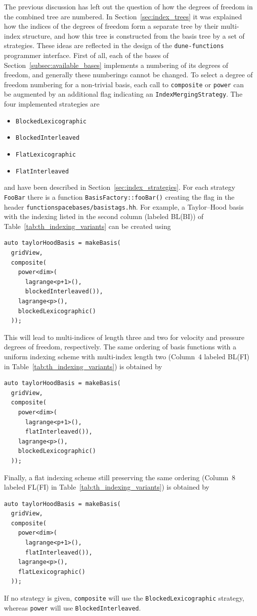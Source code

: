 \documentclass[a4paper,10pt,headings=normal,bibliography=totoc]{scrartcl}
\newcommand{\cpp}[1]{\lstinline[basicstyle=\ttfamily]!#1!}
\newcommand{\dunemodule}[1]{\texttt{#1}}
\newcommand{\file}[1]{\texttt{#1}}
\begin{document}
The previous discussion has left out the question of how the degrees of freedom in the combined tree
are numbered.  In Section~\ref{sec:index_trees} it was explained how the indices
of the degrees of freedom form a separate tree by their multi-index structure, and how this tree
is constructed from the basis tree by a set of strategies.
These ideas are reflected in the design of the \dunemodule{dune-functions} programmer interface.
First of all, each of the bases of
Section~\ref{subsec:available_bases} implements a numbering of its degrees of freedom,
and generally these numberings cannot be changed.
To select a degree of freedom numbering for a non-trivial basis,
each call to \cpp{composite} or \cpp{power} can be augmented by an additional
flag indicating an \cpp{IndexMergingStrategy}. The four implemented strategies are
\begin{itemize}
  \item
    \cpp{BlockedLexicographic}
  \item
    \cpp{BlockedInterleaved}
  \item
    \cpp{FlatLexicographic}
  \item
    \cpp{FlatInterleaved}
\end{itemize}
and have been described in Section~\ref{sec:index_strategies}.
For each strategy \cpp{FooBar} there is a function \cpp{BasisFactory::fooBar()} creating
the flag in the header \file{functionspacebases/\allowbreak basistags.hh}.
For example, a Taylor--Hood basis with the indexing listed in the
second column (labeled BL(BI)) of Table~\ref{tab:th_indexing_variants} can be created using
\begin{lstlisting}[style=Example]
auto taylorHoodBasis = makeBasis(
  gridView,
  composite(
    power<dim>(
      lagrange<p+1>(),
      blockedInterleaved()),
    lagrange<p>(),
    blockedLexicographic()
  ));
\end{lstlisting}
This will lead to multi-indices of length three and two
for velocity and pressure degrees of freedom, respectively.
The same ordering of basis functions with a uniform indexing scheme
with multi-index length two (Column~4 labeled BL(FI) in Table~\ref{tab:th_indexing_variants}) is obtained by
\begin{lstlisting}[style=Example]
auto taylorHoodBasis = makeBasis(
  gridView,
  composite(
    power<dim>(
      lagrange<p+1>(),
      flatInterleaved()),
    lagrange<p>(),
    blockedLexicographic()
  ));
\end{lstlisting}
Finally, a flat indexing scheme still preserving the same ordering
(Column~8 labeled FL(FI) in Table~\ref{tab:th_indexing_variants})
is obtained by
\begin{lstlisting}[style=Example]
auto taylorHoodBasis = makeBasis(
  gridView,
  composite(
    power<dim>(
      lagrange<p+1>(),
      flatInterleaved()),
    lagrange<p>(),
    flatLexicographic()
  ));
\end{lstlisting}
If no strategy is given, \cpp{composite} will use the \cpp{BlockedLexicographic} strategy,
where\-as \cpp{power} will use \cpp{BlockedInterleaved}.
\end{document}
